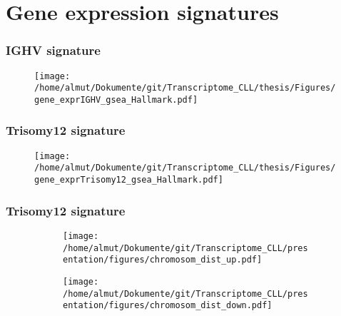 \documentclass[xcolor=dvipsnames,t,10pt]{beamer}
\begin{document}
\section{Gene expression signatures}
%
%
\begin{frame}[c]
	\frametitle{IGHV signature}
	\begin{figure}
		\centering
		\texttt{[image: /home/almut/Dokumente/git/Transcriptome\_CLL/thesis/Figures/gene\_exprIGHV\_gsea\_Hallmark.pdf]}
	\end{figure}
\end{frame}
%
%
\begin{frame}[c]
	\frametitle{Trisomy12 signature}
	\begin{figure}
		\centering
		\texttt{[image: /home/almut/Dokumente/git/Transcriptome\_CLL/thesis/Figures/gene\_exprTrisomy12\_gsea\_Hallmark.pdf]}
	\end{figure}
\end{frame}
%
%
\begin{frame}[c]
	\frametitle{Trisomy12 signature}
	\begin{figure}
		\centering
		\begin{subfigure}[t]{0.45\columnwidth}
			\texttt{[image: /home/almut/Dokumente/git/Transcriptome\_CLL/presentation/figures/chromosom\_dist\_up.pdf]}
		\end{subfigure}
		\hfill
		\begin{subfigure}[t]{0.45\columnwidth}
			\texttt{[image: /home/almut/Dokumente/git/Transcriptome\_CLL/presentation/figures/chromosom\_dist\_down.pdf]}
		\end{subfigure}
	\end{figure}
\end{frame}
%
%
\end{document}
